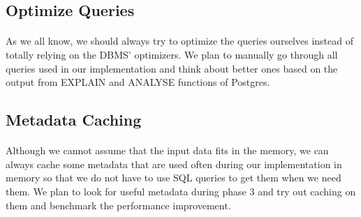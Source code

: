\subsection{Optimize Queries}
\paragraph{} As we all know, we should always try to optimize the queries ourselves instead of totally relying on the DBMS' optimizers. We plan to manually go through all queries used in our implementation and think about better ones based on the output from EXPLAIN and ANALYSE functions of Postgres.
\subsection{Metadata Caching}
\paragraph{} Although we cannot assume that the input data fits in the memory, we can always cache some metadata that are used often during our implementation in memory so that we do not have to use SQL queries to get them when we need them. We plan to look for useful metadata during phase 3 and try out caching on them and benchmark the performance improvement.


